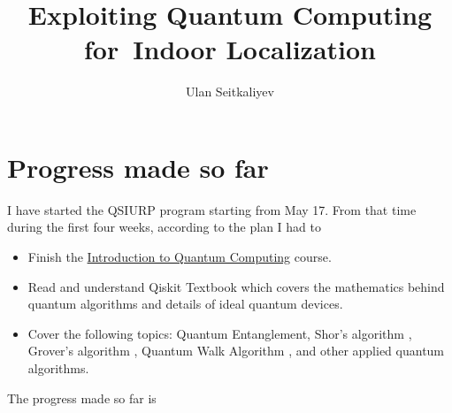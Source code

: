 \documentclass[12pt]{scrartcl}
\title{Exploiting Quantum Computing for~Indoor Localization}
\author{Ulan Seitkaliyev}
\begin{document}




\section{Progress made so far}

I have started the QSIURP program starting from May 17. From that time during the first four weeks, according to the plan I had to 
\begin{itemize}
    \item Finish the \href{https://qiskit.org/textbook-beta/course/introduction-course}{Introduction to Quantum Computing} \cite{ibm} course.
    \item Read and understand Qiskit Textbook \cite{ibm} which covers the mathematics behind quantum algorithms and details of ideal quantum devices. 
    \item Cover the following topics: Quantum Entanglement, Shor's algorithm \cite{shor}, Grover's algorithm \cite{grover}, Quantum Walk Algorithm \cite{quantumwalk}, and other applied quantum algorithms.
\end{itemize}

The progress made so far is 
\end{document}
